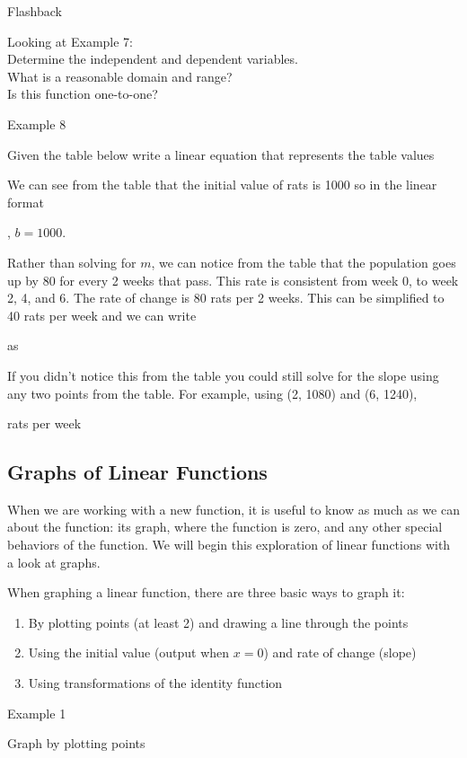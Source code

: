 Flashback

Looking at Example 7:\\
Determine the independent and dependent variables.\\
What is a reasonable domain and range?\\
Is this function one-to-one?

Example 8

Given the table below write a linear equation that represents the table
values

We can see from the table that the initial value of rats is 1000 so in
the linear format

, $b = 1000$.

Rather than solving for $m$, we can notice from the table that the
population goes up by 80 for every 2 weeks that pass. This rate is
consistent from week 0, to week 2, 4, and 6. The rate of change is 80
rats per 2 weeks. This can be simplified to 40 rats per week and we can
write

as

If you didn't notice this from the table you could still solve for the
slope using any two points from the table. For example, using (2, 1080)
and (6, 1240),

rats per week
\subsection{Graphs of Linear Functions}

When we are working with a new function, it is useful to know as much as
we can about the function: its graph, where the function is zero, and
any other special behaviors of the function. We will begin this
exploration of linear functions with a look at graphs.

When graphing a linear function, there are three basic ways to graph it:

\begin{enumerate}
\def\labelenumi{\arabic{enumi})}
\item
  By plotting points (at least 2) and drawing a line through the points
\item
  Using the initial value (output when $x = 0$) and rate of change
  (slope)
\item
  Using transformations of the identity function
\end{enumerate}

Example 1

Graph by plotting points

